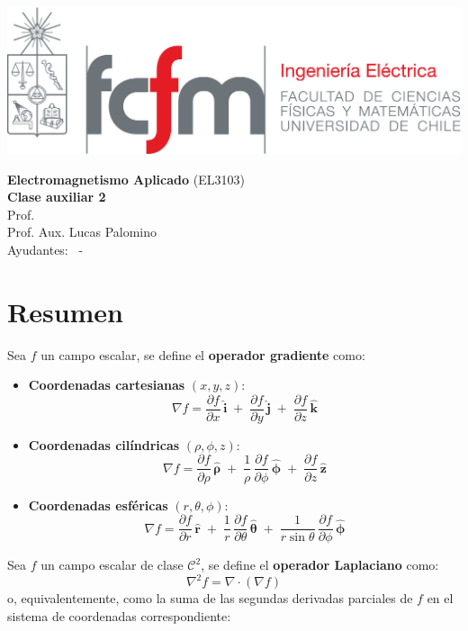 \documentclass[
  11pt,
  letterpaper,
   answers
  ]{exam}
\begin{document}
\noindent
\begin{minipage}{0.47\textwidth}
  \includegraphics[width=\textwidth]{../fcfm_die}
\end{minipage}
\begin{minipage}{0.53\textwidth}
\begin{center} 
\large\textbf{Electromagnetismo Aplicado} (EL3103) \\
\large\textbf{Clase auxiliar 2} \\
\normalsize Prof.~\professor\\
\normalsize Prof. Aux. Lucas Palomino
\\
\normalsize Ayudantes: \ayudanteA~-~\ayudanteB
\end{center}
\end{minipage}

\vspace{0.5cm}
\noindent
\vspace{.85cm}

\section{Resumen}
Sea $f$ un campo escalar, se define el \textbf{operador gradiente} como:
\begin{itemize}
    \item \textbf{Coordenadas cartesianas} $(x,y,z)$:
    \[
\nabla f = 
\frac{\partial f}{\partial x}\,\hat{\mathbf{i}} \;+\;
\frac{\partial f}{\partial y}\,\hat{\mathbf{j}} \;+\;
\frac{\partial f}{\partial z}\,\hat{\mathbf{k}}
\]
\item \textbf{Coordenadas cilíndricas} $(\rho, \phi, z)$:
\[
\nabla f =
\frac{\partial f}{\partial \rho}\,\hat{\boldsymbol\rho}
\;+\; \frac{1}{\rho}\,\frac{\partial f}{\partial \phi}\,\hat{\boldsymbol\phi}
\;+\; \frac{\partial f}{\partial z}\,\hat{\mathbf{z}}
\]
\item \textbf{Coordenadas esféricas} $(r,\theta,\phi)$:
\[
\nabla f =
\frac{\partial f}{\partial r}\,\hat{\mathbf{r}}
\;+\; \frac{1}{r}\,\frac{\partial f}{\partial \theta}\,\hat{\boldsymbol\theta}
\;+\; \frac{1}{r\sin\theta}\,\frac{\partial f}{\partial \phi}\,\hat{\boldsymbol\phi}
\]


\end{itemize}
Sea $f$ un campo escalar de clase $\mathcal{C}^2$, se define el \textbf{operador Laplaciano} como:
\[
\nabla^2 f = \nabla \cdot (\nabla f)
\]
o, equivalentemente, como la suma de las segundas derivadas parciales de $f$ en el sistema de coordenadas correspondiente:
\end{document}
